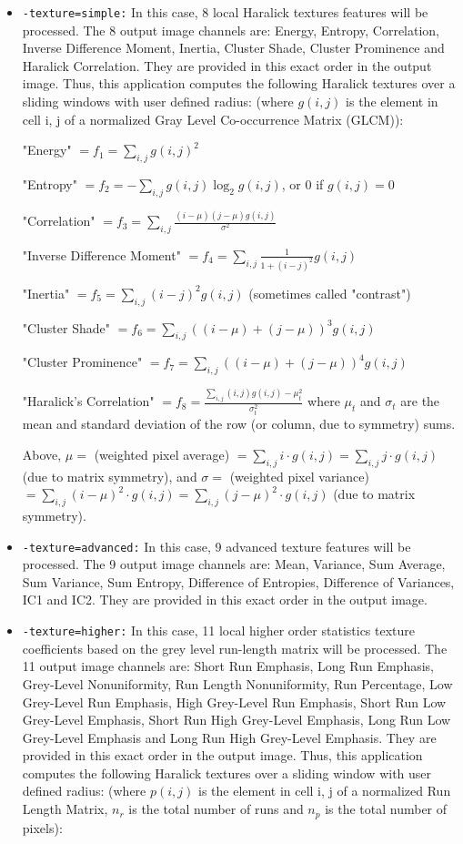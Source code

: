 \begin{itemize}
\item \verb?-texture=simple:?
In this case, 8 local Haralick textures features will be processed.
The 8 output image channels are: Energy, Entropy, Correlation, Inverse Difference
Moment, Inertia, Cluster Shade, Cluster Prominence and Haralick Correlation. They
are provided in this exact order in the output image. Thus, this application
computes the following Haralick textures over a sliding windows with user defined
radius: (where $ g(i, j) $ is the element in cell i, j of a normalized Gray Level
Co-occurrence Matrix (GLCM)):

"Energy" $ = f_1 = \sum_{i, j}g(i, j)^2 $

"Entropy" $ = f_2 = -\sum_{i, j}g(i, j) \log_2 g(i, j)$, or 0 if $g(i, j) = 0$

"Correlation" $ = f_3 = \sum_{i, j}\frac{(i - \mu)(j - \mu)g(i, j)}{\sigma^2} $

"Inverse Difference Moment" $= f_4 = \sum_{i, j}\frac{1}{1 + (i - j)^2}g(i, j) $

"Inertia" $ = f_5 = \sum_{i, j}(i - j)^2g(i, j) $ (sometimes called "contrast")

"Cluster Shade" $ = f_6 = \sum_{i, j}((i - \mu) + (j - \mu))^3 g(i, j) $

"Cluster Prominence" $ = f_7 = \sum_{i, j}((i - \mu) + (j - \mu))^4 g(i, j) $

"Haralick's Correlation" $ = f_8 = \frac{\sum_{i, j}(i, j) g(i, j) -\mu_t^2}{\sigma_t^2} $
where $\mu_t$ and $\sigma_t$ are the mean and standard deviation of the row (or
column, due to symmetry) sums.

Above, $ \mu = $ (weighted pixel average) $ = \sum_{i, j}i \cdot g(i, j) = \sum_{i, j}j \cdot g(i, j) $
(due to matrix symmetry), and $ \sigma = $ (weighted pixel variance) $ = \sum_{i, j}(i - \mu)^2 \cdot g(i, j) = \sum_{i, j}(j - \mu)^2 \cdot g(i, j) $
(due to matrix symmetry).

\item \verb?-texture=advanced:?
In this case, 9 advanced texture features will be processed. The 9 output image
channels are: Mean, Variance, Sum Average, Sum Variance, Sum Entropy, Difference of
Entropies, Difference of Variances, IC1 and IC2. They are provided in this exact
order in the output image.

\item \verb?-texture=higher:?
In this case, 11 local higher order statistics texture coefficients based on the
grey level run-length matrix will be processed. The 11 output image channels are:
Short Run Emphasis, Long Run Emphasis, Grey-Level Nonuniformity, Run Length
Nonuniformity, Run Percentage, Low Grey-Level Run Emphasis, High Grey-Level Run
Emphasis, Short Run Low Grey-Level Emphasis, Short Run High Grey-Level Emphasis,
Long Run Low Grey-Level Emphasis and Long Run High Grey-Level Emphasis. They are
provided in this exact order in the output image. Thus, this application computes
the following Haralick textures over a sliding window with user defined radius:
(where $ p(i, j) $ is the element in cell i, j of a normalized Run Length Matrix,
$n_r$ is the total number of runs and $n_p$ is the total number of pixels):


\end{itemize}
